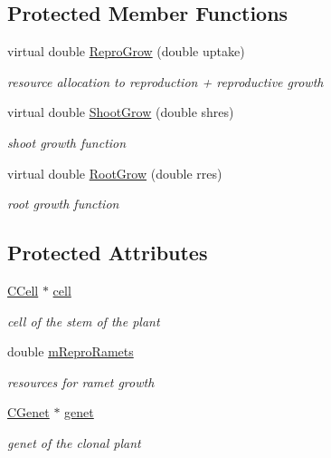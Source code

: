 \subsection*{Protected Member Functions}
\begin{DoxyCompactItemize}
\item 
virtual double \mbox{\hyperlink{class_c_plant_a250f847e35537bb60a94cf5d3ce90812}{Repro\+Grow}} (double uptake)
\begin{DoxyCompactList}\small\item\em resource allocation to reproduction + reproductive growth \end{DoxyCompactList}\item 
virtual double \mbox{\hyperlink{class_c_plant_a04fa48b79241a419192d035a3d28f839}{Shoot\+Grow}} (double shres)
\begin{DoxyCompactList}\small\item\em shoot growth function \end{DoxyCompactList}\item 
virtual double \mbox{\hyperlink{class_c_plant_a724f5a844253dac46311e85e37cc46fd}{Root\+Grow}} (double rres)
\begin{DoxyCompactList}\small\item\em root growth function \end{DoxyCompactList}\end{DoxyCompactItemize}
\subsection*{Protected Attributes}
\begin{DoxyCompactItemize}
\item 
\mbox{\hyperlink{class_c_cell}{C\+Cell}} $\ast$ \mbox{\hyperlink{class_c_plant_aa4e3f8bc03674d5017a44b6bc01faf4e}{cell}}
\begin{DoxyCompactList}\small\item\em cell of the stem of the plant \end{DoxyCompactList}\item 
\mbox{\label{class_c_plant_a348c853c2ff4525eb7435beb66a2b80f}} 
double \mbox{\hyperlink{class_c_plant_a348c853c2ff4525eb7435beb66a2b80f}{m\+Repro\+Ramets}}
\begin{DoxyCompactList}\small\item\em resources for ramet growth \end{DoxyCompactList}\item 
\mbox{\label{class_c_plant_acb01afeb25e9427226da1c823f479776}} 
\mbox{\hyperlink{class_c_genet}{C\+Genet}} $\ast$ \mbox{\hyperlink{class_c_plant_acb01afeb25e9427226da1c823f479776}{genet}}
\begin{DoxyCompactList}\small\item\em genet of the clonal plant \end{DoxyCompactList}\end{DoxyCompactItemize}


